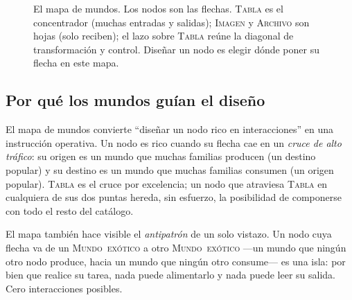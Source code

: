 \documentclass[11pt,a4paper]{article}
\theoremstyle{definition}
\theoremstyle{plain}
\newcommand{\mundo}[1]{\textsc{#1}}   %
\begin{document}
\begin{figure}[h]
\centering
{}
\caption{El mapa de mundos. Los nodos son las flechas. \mundo{Tabla} es el
concentrador (muchas entradas y salidas); \mundo{Imagen} y \mundo{Archivo} son hojas
(solo reciben); el lazo sobre \mundo{Tabla} reúne la diagonal de transformación y
control. Diseñar un nodo es elegir dónde poner su flecha en este mapa.}
\label{fig:worlds}
\end{figure}

\subsection{Por qué los mundos guían el diseño}

El mapa de mundos convierte ``diseñar un nodo rico en interacciones'' en una
instrucción operativa. Un nodo es rico cuando su flecha cae en un \emph{cruce de
alto tráfico}: su origen es un mundo que muchas familias producen (un destino
popular) y su destino es un mundo que muchas familias consumen (un origen popular).
\mundo{Tabla} es el cruce por excelencia; un nodo que atraviesa \mundo{Tabla} en
cualquiera de sus dos puntas hereda, sin esfuerzo, la posibilidad de componerse con
todo el resto del catálogo.

El mapa también hace visible el \emph{antipatrón} de un solo vistazo. Un nodo cuya
flecha va de un \mundo{Mundo\ exótico} a otro \mundo{Mundo\ exótico} ---un mundo que
ningún otro nodo produce, hacia un mundo que ningún otro consume--- es una isla:
por bien que realice su tarea, nada puede alimentarlo y nada puede leer su salida.
Cero interacciones posibles.
\end{document}
